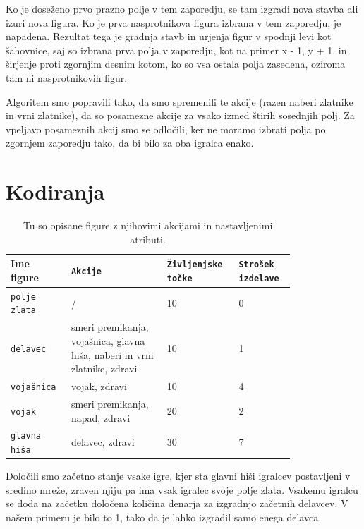 \documentclass[a4paper, 12pt]{book}
\begin{document}
\noindent
Ko je doseženo prvo prazno polje v tem zaporedju, se tam izgradi nova stavba ali izuri nova figura.
Ko je prva nasprotnikova figura izbrana v tem zaporedju, je napadena.
Rezultat tega je gradnja stavb in urjenja figur v spodnji levi kot šahovnice, saj so izbrana prva polja v zaporedju, kot na primer x - 1, y + 1, in širjenje proti zgornjim desnim kotom, ko so vsa ostala polja zasedena, oziroma tam ni nasprotnikovih figur.

Algoritem smo popravili tako, da smo spremenili te akcije (razen naberi zlatnike in vrni zlatnike), da so posamezne akcije za vsako izmed štirih sosednjih polj.
Za vpeljavo posameznih akcij smo se odločili, ker ne moramo izbrati polja po zgornjem zaporedju tako, da bi bilo za oba igralca enako.

\section{Kodiranja}
\label{kodiranja}
\begin{table}
	\begin{center}
	\begin{tabular}{p{0.15\linewidth}|p{0.3\linewidth}|p{0.18\linewidth}|p{0.17\linewidth}}
		Ime figure          & {\tt Akcije}                                                              & {\tt Življenjske točke} & {\tt Strošek izdelave} \\ \hline
		{\tt polje zlata}   & /                                                                         & 10            & 0 \\
		{\tt delavec}       & smeri premikanja, vojašnica, glavna hiša, naberi in vrni zlatnike, zdravi & 10            & 1 \\
		{\tt vojašnica}     & vojak, zdravi                                                             & 10            & 4 \\
		{\tt vojak}         & smeri premikanja, napad, zdravi                                           & 20            & 2 \\
		{\tt glavna hiša}   & delavec, zdravi                                                           & 30            & 7 \\
	\end{tabular}
	\end{center}
	\caption{Tu so opisane figure z njihovimi akcijami in nastavljenimi atributi.}
	\label{tabelfigures}
\end{table}

Določili smo začetno stanje vsake igre, kjer sta glavni hiši igralcev postavljeni v sredino mreže, zraven njiju pa ima vsak igralec svoje polje zlata. 
Vsakemu igralcu se doda na začetku določena količina denarja za izgradnjo začetnih delavcev. V našem primeru je bilo to 1, tako da je lahko izgradil samo enega delavca.
\end{document}
